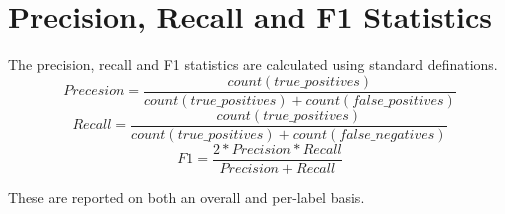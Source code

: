 \documentclass{article}
\begin{document}
\section{Precision, Recall and F1 Statistics}
The precision, recall and F1 statistics are calculated using standard definations.
\begin{equation}\label{precision}
Precesion = \frac{count(true\_positives)}{ count(true\_positives) + count(false\_positives)}
\end{equation}
\begin{equation}\label{recall}
Recall = \frac{count(true\_positives)}{ count(true\_positives) + count(false\_negatives)}
\end{equation}
\begin{equation}\label{F1}
F1 = \frac{2*Precision*Recall}{Precision+Recall} 
\end{equation}

These are reported on both an overall and per-label basis.
\end{document}
